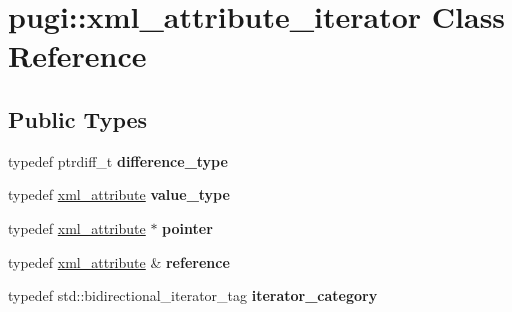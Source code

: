 \hypertarget{classpugi_1_1xml__attribute__iterator}{}\section{pugi\+:\+:xml\+\_\+attribute\+\_\+iterator Class Reference}
\label{classpugi_1_1xml__attribute__iterator}
\subsection*{Public Types}
\begin{DoxyCompactItemize}
\item 
\mbox{\label{classpugi_1_1xml__attribute__iterator_a00b3eecf2aba886a673ad2319be88618}} 
typedef ptrdiff\+\_\+t {\bfseries difference\+\_\+type}
\item 
\mbox{\label{classpugi_1_1xml__attribute__iterator_a2b0e779f12de813d7a806056ebed8907}} 
typedef \hyperlink{classpugi_1_1xml__attribute}{xml\+\_\+attribute} {\bfseries value\+\_\+type}
\item 
\mbox{\label{classpugi_1_1xml__attribute__iterator_a6ed6fb3197abb02ffa848ad6b9b7a1be}} 
typedef \hyperlink{classpugi_1_1xml__attribute}{xml\+\_\+attribute} $\ast$ {\bfseries pointer}
\item 
\mbox{\label{classpugi_1_1xml__attribute__iterator_ade97045a1217d0a7897e5f5873297117}} 
typedef \hyperlink{classpugi_1_1xml__attribute}{xml\+\_\+attribute} \& {\bfseries reference}
\item 
\mbox{\label{classpugi_1_1xml__attribute__iterator_aad988273a3e4cdc5fa3eb879dbdc8d35}} 
typedef std\+::bidirectional\+\_\+iterator\+\_\+tag {\bfseries iterator\+\_\+category}
\end{DoxyCompactItemize}

